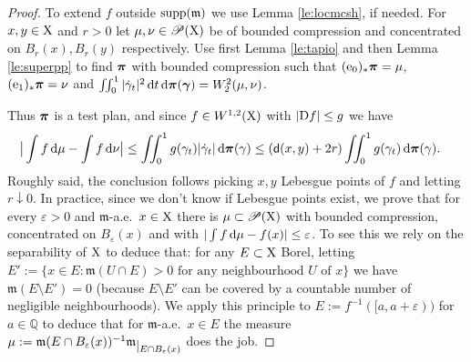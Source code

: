 \documentclass[11pt]{article}
\numberwithin{equation}{section}
\newcommand{\Q}{\mathbb{Q}}
\newcommand{\ggamma}{{\mbox{\boldmath$\gamma$}}}
\newcommand{\ppi}{{\mbox{\boldmath$\pi$}}}
\newcommand{\restr}[1]{\lower3pt\hbox{$|_{#1}$}}
\newcommand{\pr}{\mathscr P}
\newcommand{\e}{{\rm e}}
\newcommand{\X}{{\rm X}}
\newcommand{\sfd}{{\sf d}}
\newcommand{\mm}{{\mathfrak m}}
\renewcommand{\d}{{\rm d}}
\newcommand{\D}{{\rm D}}
\newcommand{\supp}{{\rm supp}}
\newcommand{\eps}{\varepsilon}
\begin{document}
\begin{proof} To extend $f$ outside $\supp(\mm)$ we use Lemma \ref{le:locmcsh}, if needed. 
For $x,y\in\X$ and $r>0$ let $\mu,\nu\in\pr(\X)$ be of bounded compression and concentrated on $B_r(x),B_r(y)$ respectively. Use first Lemma \ref{le:tapio} and then Lemma \ref{le:superpp} to find $\ppi$ with bounded compression such that $(\e_0)_*\ppi=\mu$, $(\e_1)_*\ppi=\nu$ and $\iint_0^1|\dot\gamma_t|^2\,\d t\,\d\ppi(\ggamma)=W_2^2(\mu,\nu)$. 

Thus $\ppi$ is a test plan, and since $f\in W^{1,2}(\X)$ with $|\D f|\leq g$ we have
\[
\begin{split}
\big|\int f\,\d\mu-\int f\,\d\nu\big|&\leq \iint_0^1g(\gamma_t)|\dot\gamma_t|\,\d\ppi(\gamma)\leq (\sfd(x,y)+2r)\iint^1_0g(\gamma_t)\,\d\ppi(\gamma).
\end{split}
\]
Roughly said, the conclusion follows picking $x,y$ Lebesgue points of $f$ and letting $r\downarrow0$. In practice, since we don't know if Lebesgue points exist, we    prove that for every $\eps>0$ and $\mm$-a.e.\ $x\in\X$ there is $\mu\subset \pr(\X)$  with bounded compression, concentrated on $B_\eps(x)$ and with $|\int f\,\d\mu-f(x)|\leq\eps$. To see this we rely on the separability of $\X$ to deduce that: for any $E\subset\X$ Borel, letting $E':=\{x\in E:\mm(U\cap E)>0\text{ for any neighbourhood $U$ of $x$}\}$ we have $\mm(E\setminus E')=0$ (because $E\setminus E'$ can be covered by a countable number of negligible neighbourhoods). We apply this principle to $E:=f^{-1}([a,a+\eps))$ for $a\in\Q$ to deduce that for $\mm$-a.e.\ $x\in E$ the measure $\mu:=\mm(E\cap B_\eps(x))^{-1}\mm\restr{E\cap B_\eps(x)}$ does the job.
\end{proof}
\end{document}
